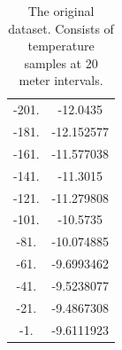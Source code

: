 \documentclass{article}%
\begin{document}
\begin{table}[h!]
\begin{tabular}{c|c}
            -201. & -12.0435   \\
            -181. & -12.152577 \\
            -161. & -11.577038 \\
            -141. & -11.3015   \\
            -121. & -11.279808 \\
            -101. & -10.5735   \\
             -81. & -10.074885 \\
             -61. &  -9.6993462\\
             -41. &  -9.5238077\\
             -21. &  -9.4867308\\
              -1. &  -9.6111923\\
        \end{tabular}
        \caption{The original dataset. Consists of temperature samples at 20 meter intervals. }
    \end{table}
\end{document}
